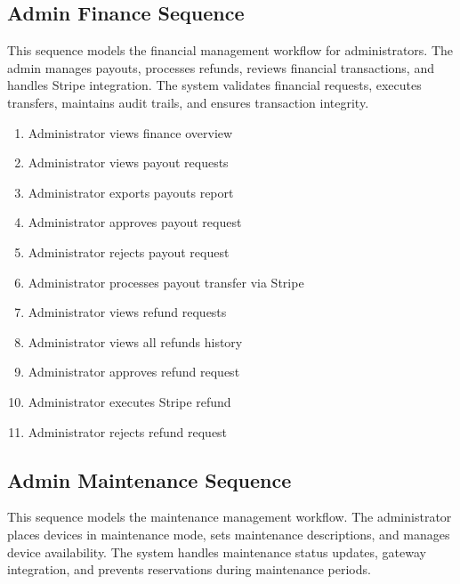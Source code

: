 
\subsection{Admin Finance Sequence}
This sequence models the financial management workflow for administrators. The
admin manages payouts, processes refunds, reviews financial transactions, and
handles Stripe integration. The system validates financial requests, executes
transfers, maintains audit trails, and ensures transaction integrity.

\begin{enumerate}[topsep=0pt,itemsep=1pt,parsep=0pt,partopsep=0pt]
    \item Administrator views finance overview
    \item Administrator views payout requests
    \item Administrator exports payouts report
    \item Administrator approves payout request
    \item Administrator rejects payout request
    \item Administrator processes payout transfer via Stripe
    \item Administrator views refund requests
    \item Administrator views all refunds history
    \item Administrator approves refund request
    \item Administrator executes Stripe refund
    \item Administrator rejects refund request
\end{enumerate}


\subsection{Admin Maintenance Sequence}
This sequence models the maintenance management workflow. The administrator
places devices in maintenance mode, sets maintenance descriptions, and manages
device availability. The system handles maintenance status updates, gateway
integration, and prevents reservations during maintenance periods.

